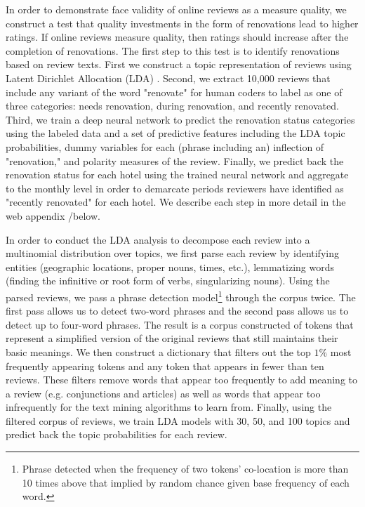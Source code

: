 \documentclass[12pt, leqno]{article}
\begin{document}
In order to demonstrate face validity of online reviews as a measure quality, we construct a test that quality investments in the form of renovations lead to higher ratings. If online reviews measure quality, then ratings should increase after the completion of renovations. The first step to this test is to identify renovations based on review texts. First we construct a topic representation of reviews using Latent Dirichlet Allocation (LDA) \citep{blei2003latent, wang2018and}. Second, we extract 10,000 reviews that include any variant of the word "renovate" for human coders to label as one of three categories: needs renovation, during renovation, and recently renovated. Third, we train a deep neural network to predict the renovation status categories using the labeled data and a set of predictive features including the LDA topic probabilities, dummy variables for each (phrase including an) inflection of "renovation," and polarity measures of the review. Finally, we predict back the renovation status for each hotel using the trained neural network and aggregate to the monthly level in order to demarcate periods reviewers have identified as "recently renovated" for each hotel. We describe each step in more detail in the web appendix /below. %

In order to conduct the LDA analysis to decompose each review into a multinomial distribution over topics, we first parse each review by identifying entities (geographic locations, proper nouns, times, etc.), lemmatizing words (finding the infinitive or root form of verbs, singularizing nouns). Using the parsed reviews, we pass a phrase detection model\footnote{Phrase detected when the frequency of two tokens' co-location is more than 10 times above that implied by random chance given base frequency of each word.} through the corpus twice. The first pass allows us to detect two-word phrases and the second pass allows us to detect up to four-word phrases. The result is a corpus constructed of tokens that represent a simplified version of the original reviews that still maintains their basic meanings. We then construct a dictionary that filters out the top $1\%$ most frequently appearing tokens and any token that appears in fewer than ten reviews. These filters remove words that appear too frequently to add meaning to a review (e.g. conjunctions and articles) as well as words that appear too infrequently for the text mining algorithms to learn from. Finally, using the filtered corpus of reviews, we train LDA models with 30, 50, and 100 topics and predict back the topic probabilities for each review. 
\end{document}
